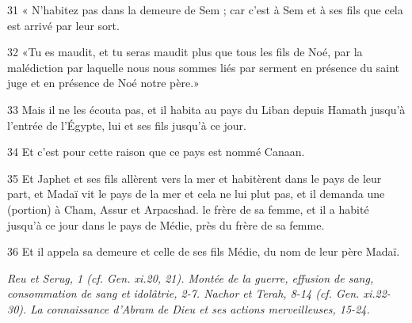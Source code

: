 \par 31 « N'habitez pas dans la demeure de Sem ; car c'est à Sem et à ses fils que cela est arrivé par leur sort.
\par 32 «Tu es maudit, et tu seras maudit plus que tous les fils de Noé, par la malédiction par laquelle nous nous sommes liés par serment en présence du saint juge et en présence de Noé notre père.»
\par 33 Mais il ne les écouta pas, et il habita au pays du Liban depuis Hamath jusqu'à l'entrée de l'Égypte, lui et ses fils jusqu'à ce jour.
\par 34 Et c'est pour cette raison que ce pays est nommé Canaan.
\par 35 Et Japhet et ses fils allèrent vers la mer et habitèrent dans le pays de leur part, et Madaï vit le pays de la mer et cela ne lui plut pas, et il demanda une (portion) à Cham, Assur et Arpacshad. le frère de sa femme, et il a habité jusqu'à ce jour dans le pays de Médie, près du frère de sa femme.
\par 36 Et il appela sa demeure et celle de ses fils Médie, du nom de leur père Madaï.


\par \textit{Reu et Serug, 1 (cf. Gen. xi.20, 21). Montée de la guerre, effusion de sang, consommation de sang et idolâtrie, 2-7. Nachor et Terah, 8-14 (cf. Gen. xi.22-30). La connaissance d'Abram de Dieu et ses actions merveilleuses, 15-24.}

